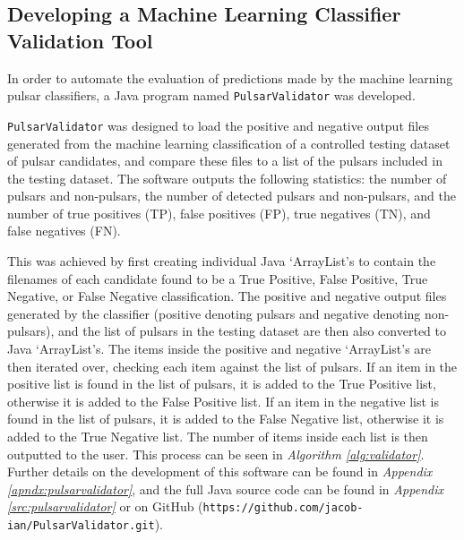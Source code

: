 \documentclass{article}
\begin{document}
\subsection{Developing a Machine Learning Classifier Validation Tool}
\label{sec:methodvalidate}

In order to automate the evaluation of predictions made by the machine learning pulsar classifiers, a Java program named \verb|PulsarValidator| was developed.

\verb|PulsarValidator| was designed to load the positive and negative output files generated from the machine learning classification of a controlled testing dataset of pulsar candidates, and compare these files to a list of the pulsars included in the testing dataset. The software outputs the following statistics: the number of pulsars and non-pulsars, the number of detected pulsars and non-pulsars, and the number of true positives (TP), false positives (FP), true negatives (TN), and false negatives (FN). 

This was achieved by first creating individual Java `ArrayList's to contain the filenames of each candidate found to be a True Positive, False Positive, True Negative, or False Negative classification. The positive and negative output files generated by the classifier (positive denoting pulsars and negative denoting non-pulsars), and the list of pulsars in the testing dataset are then also converted to Java `ArrayList's. The items inside the positive and negative `ArrayList's are then iterated over, checking each item against the list of pulsars. If an item in the positive list is found in the list of pulsars, it is added to the True Positive list, otherwise it is added to the False Positive list. If an item in the negative list is found in the list of pulsars, it is added to the False Negative list, otherwise it is added to the True Negative list. The number of items inside each list is then outputted to the user. This process can be seen in \emph{Algorithm \ref{alg:validator}}. Further details on the development of this software can be found in \emph{Appendix \ref{apndx:pulsarvalidator}}, and the full Java source code can be found in \emph{Appendix \ref{src:pulsarvalidator}} or on GitHub (\verb|https://github.com/jacob-ian/PulsarValidator.git|).
\end{document}
